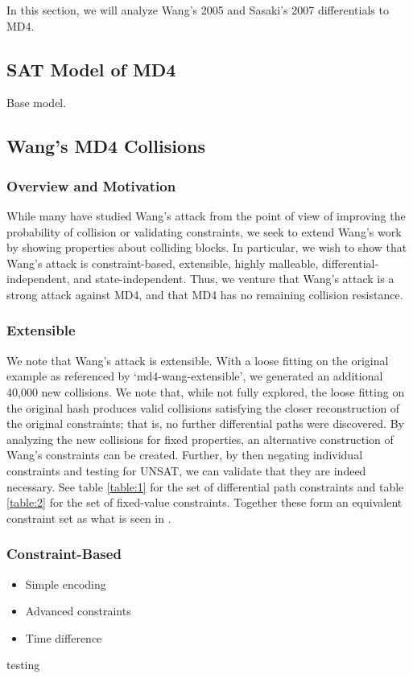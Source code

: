 \documentclass[letterpaper,twocolumn,10pt]{article}
\begin{document}
In this section, we will analyze Wang's 2005 and Sasaki's 2007 differentials to MD4.

\subsection{SAT Model of MD4}
Base model.

\subsection{Wang's MD4 Collisions}
\subsubsection{Overview and Motivation}
While many have studied Wang's attack from the point of view of improving the
probability of collision or validating constraints, we seek to extend Wang's work
by showing properties about colliding blocks. In particular, we wish to show that
Wang's attack is constraint-based, extensible, highly malleable,
differential-independent, and state-independent. Thus, we venture that Wang's
attack is a strong attack against MD4, and that MD4 has no remaining collision
resistance.

\subsubsection{Extensible}
We note that Wang's attack is extensible. With a loose fitting on the original
example as referenced by `md4-wang-extensible', we generated an additional
40,000 new collisions. We note that, while not fully explored, the loose
fitting on the original hash produces valid collisions satisfying the closer
reconstruction of the original constraints; that is, no further differential
paths were discovered. By analyzing the new collisions for fixed properties,
an alternative construction of Wang's constraints can be created. Further,
by then negating individual constraints and testing for UNSAT, we can validate
that they are indeed necessary. See table \ref{table:1} for the set of differential
path constraints and table \ref{table:2} for the set of fixed-value constraints.
Together these form an equivalent constraint set as what is seen in \cite{Wang2005}.


\subsubsection{Constraint-Based}
\begin{itemize}
    \item Simple encoding
    \item Advanced constraints
    \item Time difference
\end{itemize}
testing
\end{document}

